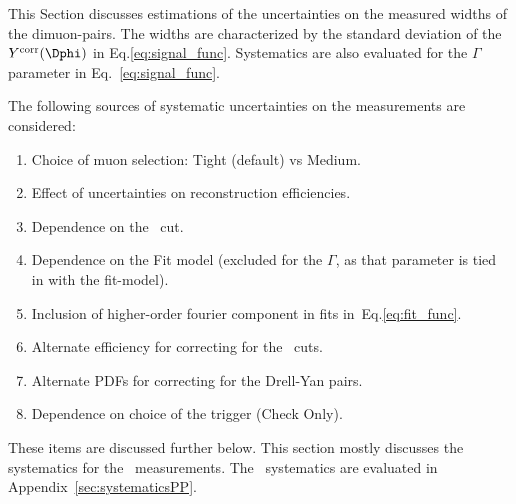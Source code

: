 This Section discusses estimations of the uncertainties on the
  measured widths \iftoggle{IncludeYields}{and Yields}{} of the dimuon-pairs.
The widths are characterized by the standard deviation of the $
  Y^{\mathrm{corr}} (\Dphi)$ in Eq.\eqref{eq:signal_func}.
Systematics are also evaluated for the $\Gamma$ parameter
  in Eq.~\eqref{eq:signal_func}.


The following sources of systematic uncertainties on the measurements 
  are considered:
\begin{enumerate}
\iftoggle{IncludeYields}
{
  \item Luminosity and \TAA\ uncertainties
}{}
\item Choice of muon selection: Tight (default) vs Medium.
\item Effect of uncertainties on reconstruction efficiencies.
\item Dependence on the \Deta\ cut.
\item Dependence on the Fit model (excluded for the $\Gamma$, as that parameter is tied in with the fit-model).
\item Inclusion of higher-order fourier component in fits in~Eq.\eqref{eq:fit_func}.
\item Alternate efficiency for correcting for the \Mmumu\ cuts.
\item Alternate PDFs for correcting for the Drell-Yan pairs.
\item Dependence on choice of the trigger (Check Only).
\end{enumerate}
These items are discussed further below. 
This section mostly discusses the systematics for the \PbPb\ measurements.
The \pp\ systematics are evaluated in Appendix~\ref{sec:systematicsPP}.





\iftoggle{IncludeYields}
{
  \subsection{Luminosity and \TAA\ uncertainties\label{sec:systematics_lumi}}
  The luminosity used in this analysis as an uncertainty of $\pm1.5\%$ for the \PbPb\
    data and 1.6\% for the \pp\ data.
  While the measured yields are not directly affected by the luminosity,
    they are reported as yields corresponding to a luminosity of 1.93~\inb.
  For the \TAA\ scaled per-event yields Eq.~\eqref{eq:TaaYield},
    the $N_{\mathrm{events}}^{\mathrm{PbPb}}$ are obtained
    using the luminosity, so luminosity uncertainties
    are directly relevant.
  This uncertainty is directly propagated as an overall uncertainty 
    on the Yields and \TAA\ scaled per-event yields (or cross-section for \pp).
  Similarly the \TAA\ uncertainties (listed in Table~\ref{tbl:TAA})
    are propagated to the \TAA\ scaled per-event yields.
  These uncertainties do not affect the widths parameters of the fits.
}{}





